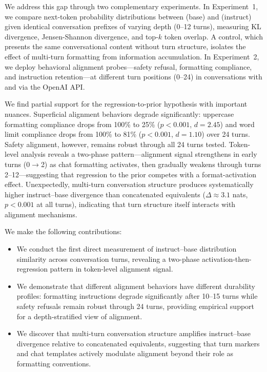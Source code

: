  We address this gap through two complementary experiments. In Experiment~1, we compare next-token probability distributions between \qwenbase (base) and \qweninst (instruct) given identical conversation prefixes of varying depth (0--12 turns), measuring KL divergence, Jensen-Shannon divergence, and top-$k$ token overlap. A \concat control, which presents the same conversational content without turn structure, isolates the effect of multi-turn formatting from information accumulation. In Experiment~2, we deploy behavioral alignment probes---safety refusal, formatting compliance, and instruction retention---at different turn positions (0--24) in conversations with \gptmini and \gptnano via the OpenAI API.

 We find partial support for the regression-to-prior hypothesis with important nuances. Superficial alignment behaviors degrade significantly: uppercase formatting compliance drops from 100\% to 25\% ($p<0.001$, $d=2.45$) and word limit compliance drops from 100\% to 81\% ($p<0.001$, $d=1.10$) over 24 turns. Safety alignment, however, remains robust through all 24 turns tested. Token-level analysis reveals a two-phase pattern---alignment signal strengthens in early turns (0$\to$2) as chat formatting activates, then gradually weakens through turns 2--12---suggesting that regression to the prior competes with a format-activation effect. Unexpectedly, multi-turn conversation structure produces systematically higher instruct--base divergence than concatenated equivalents ($\Delta \approx 3.1$ nats, $p<0.001$ at all turns), indicating that turn structure itself interacts with alignment mechanisms.

We make the following contributions:
\begin{itemize}[leftmargin=*,itemsep=0pt,topsep=2pt]
    \item We conduct the first direct measurement of instruct--base distribution similarity across conversation turns, revealing a two-phase activation-then-regression pattern in token-level alignment signal.
    \item We demonstrate that different alignment behaviors have different durability profiles: formatting instructions degrade significantly after 10--15 turns while safety refusals remain robust through 24 turns, providing empirical support for a depth-stratified view of alignment.
    \item We discover that multi-turn conversation structure amplifies instruct--base divergence relative to concatenated equivalents, suggesting that turn markers and chat templates actively modulate alignment beyond their role as formatting conventions.
\end{itemize}
